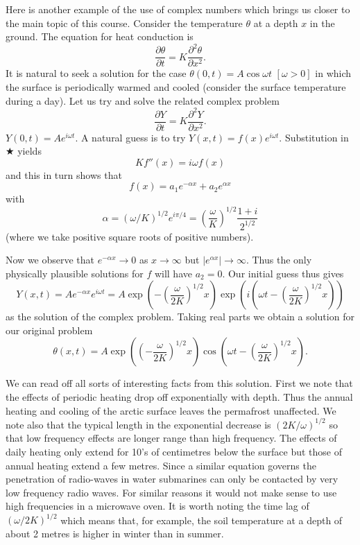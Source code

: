 \documentclass[12pt]{article}
\theoremstyle{definition}
\begin{document}
Here is another example of the use of complex numbers
which brings us closer to the main topic of this course.
Consider the temperature $\theta$ at a depth $x$ in the ground.
The equation for heat conduction is
\[
\frac{\partial\theta}{\partial t}
=K\frac{\partial^{2} \theta}{\partial x^{2}}.
\]
It is natural to seek a solution for the case
$\theta(0,t)=A \cos\omega t$ $[\omega>0]$
in which the surface is periodically
warmed and cooled (consider the surface temperature during a day).
Let us try and solve the related complex problem
\begin{equation*}\tag*{$\bigstar$}
\frac{\partial Y}{\partial t}
=K\frac{\partial^{2} Y}{\partial x^{2}}.
\end{equation*}
$Y(0,t)=Ae^{i\omega t}$. A natural guess is
to try $Y(x,t)=f(x)e^{i\omega t}$. Substitution in $\bigstar$
yields
\[Kf''(x)=i\omega f(x)\]
and this in turn shows that
\[f(x)=a_{1}e^{-\alpha x}+a_{2}e^{\alpha x}\]
with
\[\alpha=(\omega/K)^{1/2}e^{i\pi/4}=\left(\frac{\omega}{K}\right)
^{1/2}\frac{1+i}{2^{1/2}}\]
(where we take positive square roots of positive numbers).

Now we observe that $e^{-\alpha x}\rightarrow 0$ as 
$x\rightarrow\infty$ but $|e^{\alpha x}|\rightarrow \infty$.
Thus the only physically plausible solutions for $f$
will have $a_{2}=0$. Our initial guess thus gives
\[Y(x,t)=Ae^{-\alpha x}e^{i\omega t}
=A\exp\left(-\left(\frac{\omega}{2K}\right)^{1/2}x\right)
\exp\left(i\left(\omega t-\left(\frac{\omega}{2K}\right)^{1/2}x\right)
\right)\]
as the solution of the complex problem.
Taking real parts we obtain a solution for our
original problem 
\[\theta(x,t)=A\exp\left(\left(-\frac{\omega}{2K}\right)^{1/2}x\right) 
\cos\left(\omega t-\left(\frac{\omega}{2K}\right)^{1/2}x\right).\]

We can read off all sorts of interesting facts from this solution.
First we note that the effects of periodic heating drop
off exponentially with depth. Thus the annual heating
and cooling of the arctic surface leaves the permafrost
unaffected. We note also that the typical length in the
exponential decrease is $(2K/\omega)^{1/2}$ so that low frequency
effects are longer range than high frequency. The effects of
daily heating only extend for 10's of centimetres below the surface
but those of annual heating extend a few metres. Since
a similar equation governs the penetration of radio-waves in
water submarines can only be contacted by very low frequency
radio waves. For similar reasons
it would not make sense to use high frequencies in
a microwave oven. It is worth noting the time lag of
$(\omega/2K)^{1/2}$ which means that, for example,
the soil temperature at a depth of about 2 metres is
higher in winter than in summer.
\end{document}

